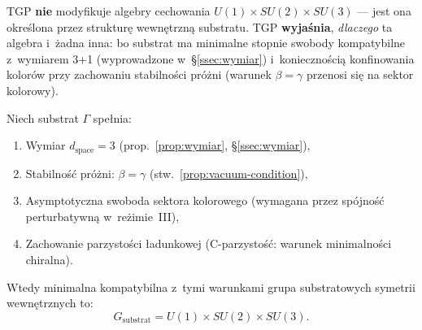 \begin{remark}
TGP \textbf{nie} modyfikuje algebry cechowania $U(1) \times SU(2)
\times SU(3)$ --- jest ona określona przez strukturę wewnętrzną
substratu. TGP \textbf{wyjaśnia}, \emph{dlaczego} ta algebra
i~żadna inna: bo substrat ma minimalne stopnie swobody kompatybilne
z~wymiarem 3+1 (wyprowadzone w~\S\ref{ssec:wymiar})
i~koniecznością konfinowania kolorów przy zachowaniu stabilności
próżni (warunek $\beta = \gamma$ przenosi się na sektor kolorowy).
\end{remark}

\begin{theorem}%
\label{thm:gauge-uniqueness}
Niech substrat $\Gamma$ spełnia:
\begin{enumerate}[nosep]
    \item[(G1)] Wymiar $d_{\mathrm{space}} = 3$
          (prop.~\ref{prop:wymiar}, \S\ref{ssec:wymiar}),
    \item[(G2)] Stabilność próżni: $\beta = \gamma$ (stw.~\ref{prop:vacuum-condition}),
    \item[(G3)] Asymptotyczna swoboda sektora kolorowego
          (wymagana przez spójność perturbatywną w~reżimie~III),
    \item[(G4)] Zachowanie parzystości ładunkowej
          (C-parzystość: warunek minimalności chiralna).
\end{enumerate}
Wtedy minimalna kompatybilna z~tymi warunkami grupa substratowych
symetrii wewnętrznych to:
\begin{equation}\label{eq:gauge-group-unique}
    \boxed{
        G_{\mathrm{substrat}} = U(1) \times SU(2) \times SU(3).
    }
\end{equation}
\end{theorem}

